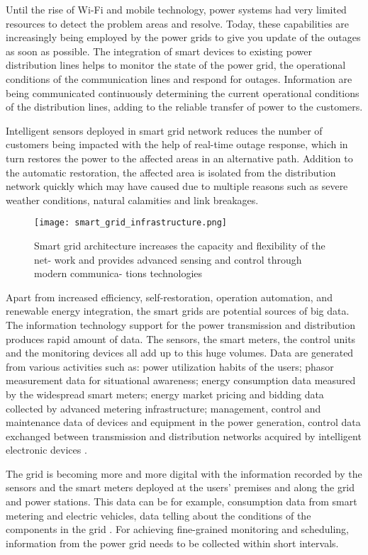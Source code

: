 Until the rise of Wi-Fi and mobile technology, power systems had very limited resources to detect the problem areas and resolve. Today, these capabilities are increasingly being employed by the power grids to give you update of the outages as soon as possible. The integration of smart devices to existing power distribution lines helps to monitor the state of the power grid, the operational conditions of the communication lines and respond for outages. Information are being communicated continuously determining the current operational conditions of the distribution lines, adding to the reliable transfer of power to the customers. 

Intelligent sensors deployed in smart grid network reduces the number of customers being impacted with the help of real-time outage response, which in turn restores the power to the affected areas in an alternative path. Addition to the automatic restoration, the affected area is isolated from the distribution network quickly which may have caused due to multiple reasons such as severe weather conditions, natural calamities and link breakages. 


\begin{figure}
\centerline{\texttt{[image: smart\_grid\_infrastructure.png]}}
    \caption{Smart grid architecture increases the capacity and flexibility of the net- work and provides advanced sensing and control through modern communica- tions technologies \cite{gungor2011smart}}
    \label{fig:mesh}
\end{figure}

Apart from increased efficiency, self-restoration, operation automation, and renewable energy integration, the smart grids are potential sources of big data. The information technology support for the power transmission and distribution produces rapid amount of data. The sensors, the smart meters, the control units and the monitoring devices all add up to this huge volumes. Data are generated from various activities such as: power utilization habits of the users; phasor measurement data for situational awareness; energy consumption data measured by the widespread smart meters; energy market pricing and bidding data collected by advanced metering infrastructure; management, control and maintenance data of devices and equipment in the power generation, control data exchanged between transmission and distribution networks acquired by intelligent electronic devices \cite{lai2015big}. 

The grid is becoming more and more digital with the information recorded by the sensors and the smart meters deployed at the users' premises and along the grid and power stations. This data can be for example, consumption data from smart metering and electric vehicles, data telling about the conditions of the components in the grid \cite{aiello2014smart}. For achieving fine-grained monitoring and scheduling, information from the power grid needs to be collected within short intervals. 


